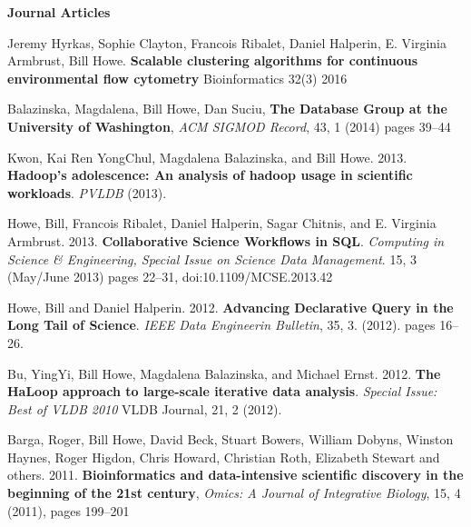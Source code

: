 {\bf Journal Articles}
\begin{bulletlist}

\item Jeremy Hyrkas, Sophie Clayton, Francois Ribalet, Daniel Halperin, E. Virginia Armbrust, Bill Howe. 
\textbf{Scalable clustering algorithms for continuous environmental flow cytometry}
Bioinformatics 32(3) 2016

\item Balazinska, Magdalena, Bill Howe, Dan Suciu,
\textbf{The Database Group at the University of Washington},
\emph{ACM SIGMOD Record}, 43, 1 (2014) pages 39--44

\item Kwon, Kai Ren YongChul, Magdalena Balazinska, and Bill Howe. 2013. \textbf{Hadoop's
adolescence: An analysis of hadoop usage in scientific workloads}.
\emph{PVLDB} (2013). 

\item Howe, Bill, Francois Ribalet, Daniel
Halperin, Sagar Chitnis, and E. Virginia Armbrust. 2013. \textbf{Collaborative
Science Workflows in SQL}. \emph{Computing in Science \& Engineering,
Special Issue on Science Data Management}. 15, 3 (May/June 2013) pages 22--31, 
doi:10.1109/MCSE.2013.42


\item Howe, Bill and Daniel Halperin. 2012. 
\textbf{Advancing Declarative Query in the Long Tail of Science}. 
\emph{IEEE Data Engineerin Bulletin},
35, 3. (2012). pages 16--26.

\item Bu, YingYi, Bill Howe, Magdalena Balazinska, and Michael
Ernst. 2012. \textbf{The HaLoop approach to large-scale iterative data analysis}.
\emph{Special Issue: Best of VLDB 2010} VLDB Journal, 21, 2 (2012).

\item Barga, Roger, Bill Howe, David Beck, Stuart Bowers, William Dobyns, Winston Haynes, 
Roger Higdon, Chris Howard, Christian Roth, Elizabeth Stewart and others. 2011.
\textbf{Bioinformatics and data-intensive scientific discovery in the beginning of the 21st century},
\emph{Omics: A Journal of Integrative Biology}, 15, 4 (2011), pages 199--201


\end{bulletlist}
